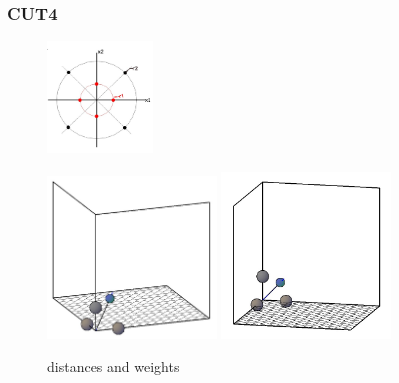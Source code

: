 \documentclass{beamer}
\begin{document}
\begin{frame}
\frametitle{CUT4}
\begin{figure}[h]
	\centering
	\includegraphics[width=0.25\textwidth]{2dconjaxis.jpg}
\end{figure}
\begin{figure}[h]
	\centering
	\includegraphics[width=0.4\textwidth]{4thmoment3d1.jpg}
	\includegraphics[width=0.4\textwidth]{4thmoment3d3.jpg}
	\caption{distances and weights}
\end{figure}
\end{frame}
\end{document}
